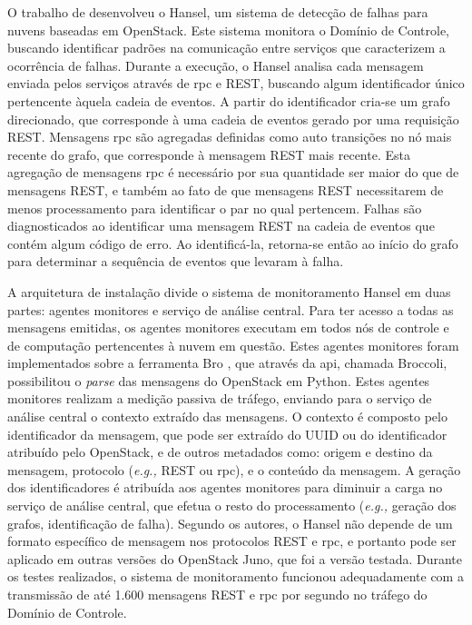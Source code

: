 O trabalho de  desenvolveu o Hansel, um sistema de detecção de falhas para nuvens baseadas em OpenStack.
%
Este sistema monitora o Domínio de Controle, buscando identificar padrões na comunicação entre serviços que caracterizem a ocorrência de falhas.
%
Durante a execução, o Hansel analisa cada mensagem enviada pelos serviços através de \ac{rpc} e REST, buscando algum identificador único pertencente àquela cadeia de eventos.
%
A partir do identificador cria-se um grafo direcionado, que corresponde à uma cadeia de eventos gerado por uma requisição REST.
%
Mensagens \ac{rpc} são agregadas definidas como auto transições no nó mais recente do grafo, que corresponde à mensagem REST mais recente.
%
Esta agregação de mensagens \ac{rpc} é necessário por sua quantidade ser maior do que de mensagens REST, e também ao fato de que mensagens REST necessitarem de menos processamento para identificar o par no qual pertencem.
%
Falhas são diagnosticados ao identificar uma mensagem REST na cadeia de eventos que contém algum código de erro.
%
Ao identificá-la, retorna-se então ao início do grafo para determinar a sequência de eventos que levaram à falha.

A arquitetura de instalação divide o sistema de monitoramento Hansel em duas partes: agentes monitores e serviço de análise central.
%
Para ter acesso a todas as mensagens emitidas, os agentes monitores executam em todos nós de controle e de computação pertencentes à nuvem em questão.
%
Estes agentes monitores foram implementados sobre a ferramenta Bro \cite{paxson:1999:bro}, que através da \ac{api}, chamada Broccoli, possibilitou o \textit{parse} das mensagens do OpenStack em Python.
%
Estes agentes monitores realizam a medição passiva de tráfego, enviando para o serviço de análise central o contexto extraído das mensagens.
%
O contexto é composto pelo identificador da mensagem, que pode ser extraído do UUID ou do identificador atribuído pelo OpenStack, e de outros metadados como: origem e destino da mensagem, protocolo (\textit{e.g.,} REST ou \ac{rpc}), e o conteúdo da mensagem. 
%
A geração dos identificadores é atribuída aos agentes monitores para diminuir a carga no serviço de análise central, que efetua o resto do processamento (\textit{e.g.,} geração dos grafos, identificação de falha).
%
Segundo os autores, o Hansel não depende de um formato específico de mensagem nos protocolos REST e \ac{rpc}, e portanto pode ser aplicado em outras versões do OpenStack Juno, que foi a versão testada.
%
Durante os testes realizados, o sistema de monitoramento funcionou adequadamente com a transmissão de até 1.600 mensagens REST e \ac{rpc} por segundo no tráfego do Domínio de Controle.

